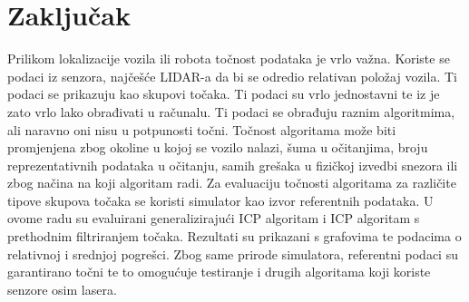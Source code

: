 \chapter{Zaključak}
Prilikom lokalizacije vozila ili robota točnost podataka je vrlo važna. Koriste se podaci iz senzora, najčešće LIDAR-a da bi se odredio relativan položaj vozila. Ti podaci se prikazuju kao skupovi točaka. Ti podaci su vrlo jednostavni te iz je zato vrlo lako obrađivati u računalu. Ti podaci se obrađuju raznim algoritmima, ali naravno oni nisu u potpunosti točni. Točnost algoritama može biti promjenjena zbog okoline u kojoj se vozilo nalazi, šuma u očitanjima, broju reprezentativnih podataka u očitanju, samih grešaka u fizičkoj izvedbi snezora ili zbog načina na koji algoritam radi. Za evaluaciju točnosti algoritama za različite tipove skupova točaka se koristi simulator kao izvor referentnih podataka. U ovome radu su evaluirani generalizirajući ICP algoritam i ICP algoritam s prethodnim filtriranjem točaka. Rezultati su prikazani s grafovima te podacima o relativnoj i srednjoj pogrešci. Zbog same prirode simulatora, referentni podaci su garantirano točni te to omogućuje testiranje i drugih algoritama koji koriste senzore osim lasera.